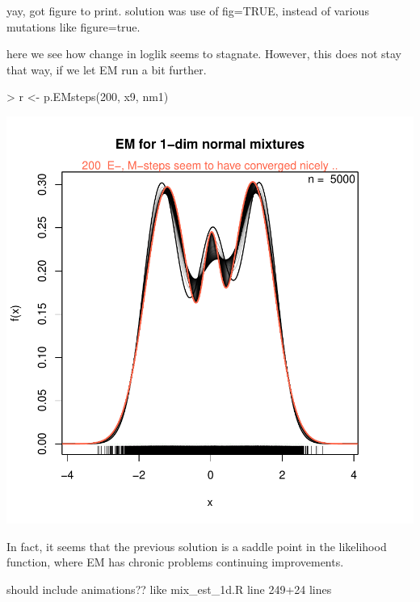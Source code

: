 yay, got figure to print. solution was use of fig=TRUE, instead of various mutations like figure=true.

here we see how change in loglik seems to stagnate. However, this does not stay that way, if we let EM run a bit further.

\begin{Schunk}
\begin{Sinput}
> r <- p.EMsteps(200, x9, nm1)
\end{Sinput}
\end{Schunk}
\includegraphics{chapter1-003}

In fact, it seems that the previous solution is a saddle point in the likelihood function, where EM has chronic problems continuing improvements.

should include animations?? like mix\_est\_1d.R line 249+24 lines

